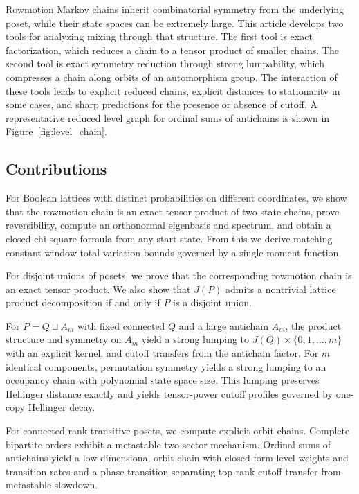 \documentclass[final,3p,times]{elsarticle}
\theoremstyle{definition}
\begin{document}
Rowmotion Markov chains inherit combinatorial symmetry from the underlying poset, while their state spaces can be extremely large.
This article develops two tools for analyzing mixing through that structure.
The first tool is exact factorization, which reduces a chain to a tensor product of smaller chains.
The second tool is exact symmetry reduction through strong lumpability, which compresses a chain along orbits of an automorphism group.
The interaction of these tools leads to explicit reduced chains, explicit distances to stationarity in some cases, and sharp predictions for the presence or absence of cutoff.
A representative reduced level graph for ordinal sums of antichains is shown in Figure~\ref{fig:level_chain}.

\subsection{Contributions}

For Boolean lattices with distinct probabilities on different coordinates, we show that the rowmotion chain is an exact tensor product of two-state chains, prove reversibility, compute an orthonormal eigenbasis and spectrum, and obtain a closed chi-square formula from any start state. From this we derive matching constant-window total variation bounds governed by a single moment function.

For disjoint unions of posets, we prove that the corresponding rowmotion chain is an exact tensor product. We also show that $J(P)$ admits a nontrivial lattice product decomposition if and only if $P$ is a disjoint union.

For $P=Q\sqcup A_m$ with fixed connected $Q$ and a large antichain $A_m$, the product structure and symmetry on $A_m$ yield a strong lumping to $J(Q)\times\{0,1,\dots,m\}$ with an explicit kernel, and cutoff transfers from the antichain factor. For $m$ identical components, permutation symmetry yields a strong lumping to an occupancy chain with polynomial state space size. This lumping preserves Hellinger distance exactly and yields tensor-power cutoff profiles governed by one-copy Hellinger decay.

For connected rank-transitive posets, we compute explicit orbit chains. Complete bipartite orders exhibit a metastable two-sector mechanism. Ordinal sums of antichains yield a low-dimensional orbit chain with closed-form level weights and transition rates and a phase transition separating top-rank cutoff transfer from metastable slowdown.
\end{document}
